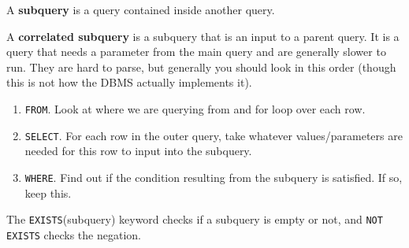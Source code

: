     \begin{definition}[Subquery]
      A \textbf{subquery} is a query contained inside another query. 
    \end{definition}

    \begin{definition}
      A \textbf{correlated subquery} is a subquery that is an input to a parent query. It is a query that needs a parameter from the main query and are generally slower to run. They are hard to parse, but generally you should look in this order (though this is not how the DBMS actually implements it). 
      \begin{enumerate}
        \item \texttt{FROM}. Look at where we are querying from and for loop over each row. 
        \item \texttt{SELECT}. For each row in the outer query, take whatever values/parameters are needed for this row to input into the subquery. 
        \item \texttt{WHERE}. Find out if the condition resulting from the subquery is satisfied. If so, keep this. 
      \end{enumerate}
    \end{definition}

    \begin{definition}
      The \texttt{EXISTS}(subquery) keyword checks if a subquery is empty or not, and \texttt{NOT EXISTS} checks the negation. 
    \end{definition}

